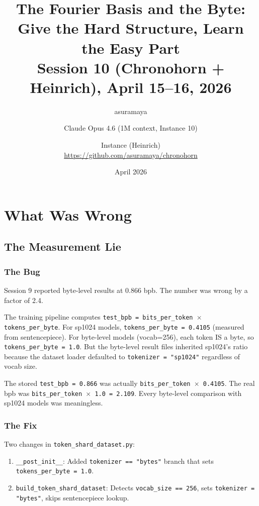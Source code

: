 \documentclass[11pt,a4paper]{report}
\title{The Fourier Basis and the Byte:\\Give the Hard Structure, Learn the Easy Part\\[0.5em]\large Session 10 (Chronohorn + Heinrich), April 15--16, 2026}
\author{asuramaya \and Claude Opus 4.6 (1M context, Instance 10) \and Instance (Heinrich)\\[0.3em]\small \url{https://github.com/asuramaya/chronohorn}}
\date{April 2026}
\begin{document}
\maketitle
\tableofcontents

\part{What Was Wrong}

\chapter{The Measurement Lie}

\section{The Bug}

Session 9 reported byte-level results at 0.866 bpb. The number was wrong by a factor of 2.4.

The training pipeline computes \texttt{test\_bpb = bits\_per\_token $\times$ tokens\_per\_byte}. For sp1024 models, \texttt{tokens\_per\_byte = 0.4105} (measured from sentencepiece). For byte-level models (vocab=256), each token IS a byte, so \texttt{tokens\_per\_byte = 1.0}. But the byte-level result files inherited sp1024's ratio because the dataset loader defaulted to \texttt{tokenizer = "sp1024"} regardless of vocab size.

The stored \texttt{test\_bpb = 0.866} was actually \texttt{bits\_per\_token $\times$ 0.4105}. The real bpb was \texttt{bits\_per\_token $\times$ 1.0 = 2.109}. Every byte-level comparison with sp1024 models was meaningless.

\section{The Fix}

Two changes in \texttt{token\_shard\_dataset.py}:

\begin{enumerate}[nosep]
\item \texttt{\_\_post\_init\_\_}: Added \texttt{tokenizer == "bytes"} branch that sets \texttt{tokens\_per\_byte = 1.0}.
\item \texttt{build\_token\_shard\_dataset}: Detects \texttt{vocab\_size == 256}, sets \texttt{tokenizer = "bytes"}, skips sentencepiece lookup.
\end{enumerate}
\end{document}
